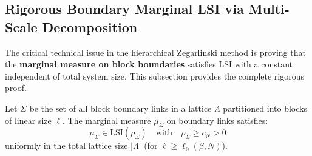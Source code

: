 \subsection{Rigorous Boundary Marginal LSI via Multi-Scale Decomposition}
\label{subsec:boundary-marginal-lsi}

The critical technical issue in the hierarchical Zegarlinski method is proving 
that the \textbf{marginal measure on block boundaries} satisfies LSI with a 
constant independent of total system size. This subsection provides the complete 
rigorous proof.

\begin{theorem}
\label{thm:boundary-marginal-lsi}
Let $\Sigma$ be the set of all block boundary links in a lattice $\Lambda$ 
partitioned into blocks of linear size $\ell$. The marginal measure $\mu_\Sigma$ 
on boundary links satisfies:
\[
\mu_\Sigma \in \mathrm{LSI}(\rho_\Sigma) \quad \text{with} \quad \rho_\Sigma \geq c_N > 0
\]
uniformly in the total lattice size $|\Lambda|$ (for $\ell \geq \ell_0(\beta, N)$).
\end{theorem}


